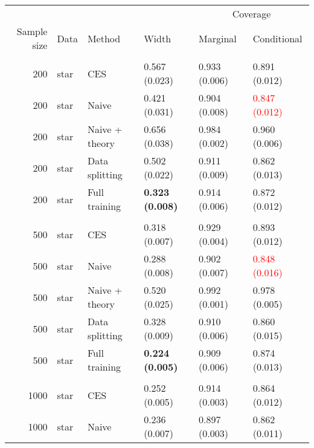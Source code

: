 
\begin{tabular}[t]{rlllll}
\toprule
\multicolumn{4}{c}{ } & \multicolumn{2}{c}{Coverage} \\
\cmidrule(l{3pt}r{3pt}){5-6}
Sample size & Data & Method & Width & Marginal & Conditional\\
\midrule
\addlinespace[0.3em]
\multicolumn{6}{l}{\textbf{200}}\\
\hspace{1em}200 & star & CES & 0.567 (0.023) & 0.933 (0.006) & 0.891 (0.012)\\
\hspace{1em}200 & star & Naive & 0.421 (0.031) & 0.904 (0.008) & \textcolor{red}{0.847 (0.012)}\\
\hspace{1em}200 & star & Naive + theory & 0.656 (0.038) & 0.984 (0.002) & 0.960 (0.006)\\
\hspace{1em}200 & star & Data splitting & 0.502 (0.022) & 0.911 (0.009) & 0.862 (0.013)\\
\hspace{1em}200 & star & Full training & \textbf{0.323 (0.008)} & 0.914 (0.006) & 0.872 (0.012)\\
\addlinespace[0.3em]
\multicolumn{6}{l}{\textbf{500}}\\
\hspace{1em}500 & star & CES & 0.318 (0.007) & 0.929 (0.004) & 0.893 (0.012)\\
\hspace{1em}500 & star & Naive & 0.288 (0.008) & 0.902 (0.007) & \textcolor{red}{0.848 (0.016)}\\
\hspace{1em}500 & star & Naive + theory & 0.520 (0.025) & 0.992 (0.001) & 0.978 (0.005)\\
\hspace{1em}500 & star & Data splitting & 0.328 (0.009) & 0.910 (0.006) & 0.860 (0.015)\\
\hspace{1em}500 & star & Full training & \textbf{0.224 (0.005)} & 0.909 (0.006) & 0.874 (0.013)\\
\addlinespace[0.3em]
\multicolumn{6}{l}{\textbf{1000}}\\
\hspace{1em}1000 & star & CES & 0.252 (0.005) & 0.914 (0.003) & 0.864 (0.012)\\
\hspace{1em}1000 & star & Naive & 0.236 (0.007) & 0.897 (0.003) & 0.862 (0.011)\\

\end{tabular}
